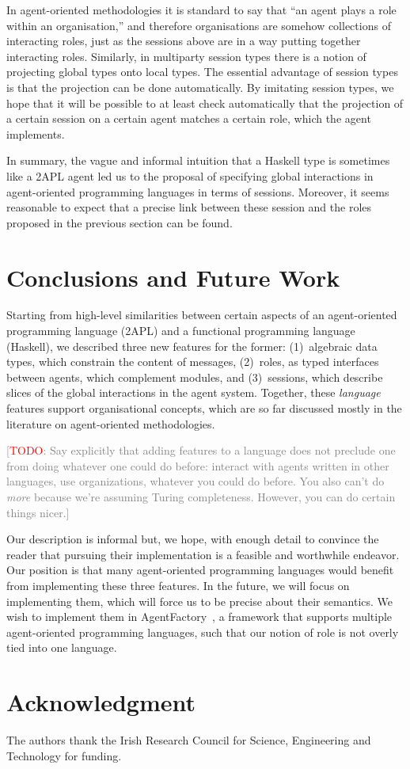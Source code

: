 \documentclass[conference,compsoc]{IEEEtran} %
\newcommand{\todo}[1]{{\small \textcolor{gray}{[\textcolor{red}{TODO}: #1]}}}
\begin{document}
In agent-oriented methodologies it is standard to say that ``an agent plays
a role within an organisation,'' and therefore organisations are somehow
collections of interacting roles, just as the sessions above are in a way
putting together interacting roles. Similarly, in multiparty session types
there is a notion of projecting global types onto local types. The
essential advantage of session types is that the projection can be done
automatically. By imitating session types, we hope that it will be possible
to at least check automatically that the projection of a certain session on
a certain agent matches a certain role, which the agent implements.

In summary, the vague and informal intuition that a Haskell type is
sometimes like a 2APL agent led us to the proposal of specifying global
interactions in agent-oriented programming languages in terms of sessions.
Moreover, it seems reasonable to expect that a precise link between these
session and the roles proposed in the previous section can be found.

\section{Conclusions and Future Work} %

Starting from high-level similarities between certain aspects of an
agent-oriented programming language (2APL) and a functional programming
language (Haskell), we described three new features for the former:
(1)~algebraic data types, which constrain the content of messages,
(2)~roles, as typed interfaces between agents, which complement modules,
and (3)~sessions, which describe slices of the global interactions in the
agent system. Together, these \emph{language} features support
organisational concepts, which are so far discussed mostly in the
literature on agent-oriented methodologies.

\todo{Say explicitly that adding features to a language does not preclude
one from doing whatever one could do before: interact with agents written
in other languages, use organizations, whatever you could do before. You
also can't do \emph{more} because we're assuming Turing completeness.
However, you can do certain things nicer.}

Our description is informal but, we hope, with enough detail to convince
the reader that pursuing their implementation is a feasible and worthwhile
endeavor. Our position is that many agent-oriented programming languages
would benefit from implementing these three features. In the future, we
will focus on implementing them, which will force us to be precise about
their semantics. We wish to implement them in AgentFactory~\cite{phd:rem},
a framework that supports multiple agent-oriented programming languages,
such that our notion of role is not overly tied into one language.

\section*{Acknowledgment}

The authors thank the Irish Research Council for Science, Engineering and
Technology for funding.




\end{document}
